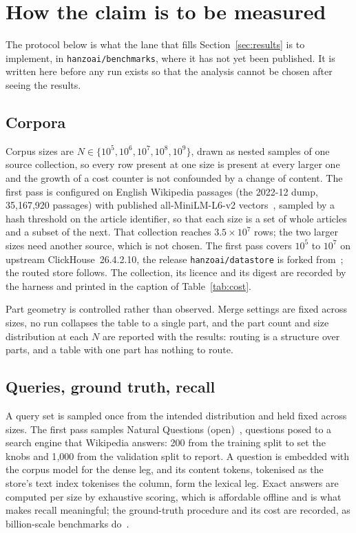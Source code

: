 \section{How the claim is to be measured}
\label{sec:method}

The protocol below is what the lane that fills Section~\ref{sec:results} is to
implement, in \texttt{hanzoai/benchmarks}, where it has not yet been published.
It is written here before any run exists so that the analysis cannot be chosen
after seeing the results.

\subsection{Corpora}

Corpus sizes are $N \in \{10^5, 10^6, 10^7, 10^8, 10^9\}$, drawn as nested
samples of one source collection, so every row present at one size is present
at every larger one and the growth of a cost counter is not confounded by a
change of content. The first pass is configured on English Wikipedia passages
(the 2022-12 dump, 35{,}167{,}920 passages) with published all-MiniLM-L6-v2
vectors~\cite{reimers2019sbert}, sampled by a hash threshold on the article
identifier, so that each size is a set of whole articles and a subset of the
next. That collection reaches $3.5 \times 10^7$ rows; the two larger sizes need
another source, which is not chosen. The first pass covers $10^5$ to $10^7$ on
upstream ClickHouse~26.4.2.10, the release \texttt{hanzoai/datastore} is forked
from~\cite{hanzodatastore}; the routed store follows. The collection, its licence
and its digest are recorded by the harness and printed in the caption of
Table~\ref{tab:cost}.

Part geometry is controlled rather than observed. Merge settings are fixed
across sizes, no run collapses the table to a single part, and the part count
and size distribution at each $N$ are reported with the results: routing is a
structure over parts, and a table with one part has nothing to route.

\subsection{Queries, ground truth, recall}

A query set is sampled once from the intended distribution and held fixed
across sizes. The first pass samples Natural Questions
(open)~\cite{kwiatkowski2019nq,lee2019orqa}, questions posed to a search engine
that Wikipedia answers: 200 from the training split to set the knobs and 1{,}000
from the validation split to report. A question is embedded with the corpus
model for the dense leg, and its content tokens, tokenised as the store's text
index tokenises the column, form the lexical leg. Exact answers are computed per size by exhaustive scoring, which
is affordable offline and is what makes recall meaningful; the ground-truth
procedure and its cost are recorded, as billion-scale benchmarks
do~\cite{simhadri2022bigann}.


